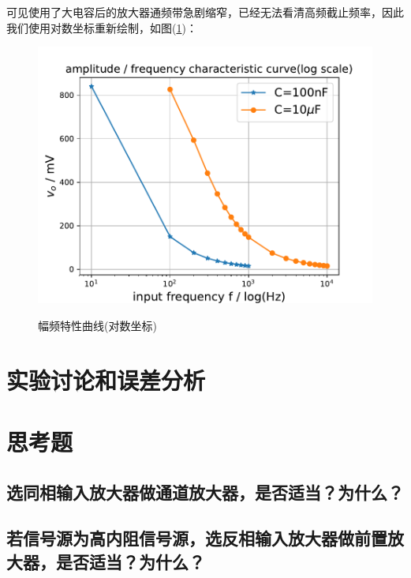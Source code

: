 \documentclass[a4paper]{article}
\begin{document}
可见使用了大电容后的放大器通频带急剧缩窄，已经无法看清高频截止频率，因此我们使用对数坐标重新绘制，如图(\ref{AFC_log})：
\begin{figure}[!h]
\centering
\includegraphics[width=14cm]{fig/AFC_log.pdf}\\
\caption{幅频特性曲线(对数坐标)}\label{AFC_log}
\end{figure}

\section{实验讨论和误差分析}

\section{思考题}
\subsection{选同相输入放大器做通道放大器，是否适当？为什么？}
\subsection{若信号源为高内阻信号源，选反相输入放大器做前置放大器，是否适当？为什么？}

\nocite{jiaocai}

\end{document}
